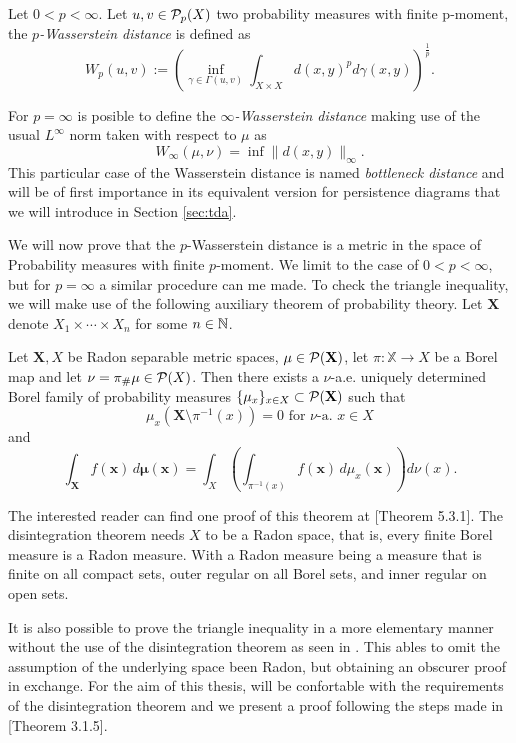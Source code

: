 \begin{definition}
    Let $ 0 < p < \infty $. Let $ u, v \in \mathcal P_p (X) $ two probability measures with finite p-moment, the {\it $p$-Wasserstein distance} is defined as
    $$
        W_p(u, v) := \left( \inf_{\gamma \in \Gamma(u, v)} \int_{X \times X} d(x,y)^p d\gamma(x, y)\right)^{\frac{1}{p}}.
    $$
\end{definition}
For $ p= \infty $ is posible to define the {\it $\infty$-Wasserstein distance} making use of the usual $ L^\infty $ norm taken with respect to $ \mu $ as
$$
    W_\infty (\mu, \nu) = \inf \| d(x, y) \|_\infty.
$$
This particular case of the Wasserstein distance is named {\it bottleneck distance} and will be of first importance in its equivalent version for persistence diagrams that we will introduce in Section \ref{sec:tda}.

We will now prove that the $p$-Wasserstein distance is a metric in the space of Probability measures with finite $p$-moment. We limit to the case of $ 0 < p < \infty $, but for $ p= \infty $ a similar procedure can me made. To check the triangle inequality, we will make use of the following auxiliary theorem of probability theory. Let $ \mathbf X $ denote $ X_1  \times \cdots \times X_n $ for some $ n \in \mathbb N $.

\begin{theorem}[Disintegration] \label{thm:disintegration}
    Let $ \mathbf X, X $ be Radon separable metric spaces, $ \mathbf \mu \in \mathcal P(\mathbf X) $, let $ \pi: \mathbb X \to X $ be a Borel map and let $ \nu = \pi_\#\mu \in \mathcal P(X) $. Then there exists a $\nu$-a.e. uniquely determined Borel family of probability measures $ \{\mu_x\}_{x \in X} \subset \mathcal P(\mathbf X) $ such that
    $$
        \mu_x(\mathbf X \setminus \pi^{-1}(x)) = 0 \text{ for } \nu \text{-a. } x \in X
    $$
    and
    $$
        \int_{\mathbf X} f(\mathbf x) \, d \mathbf \mu( \mathbf x) = \int_X \left( \int_{\pi^{-1}(x)} f(\mathbf x) \, d\mu_x( \mathbf x) \right) d\nu(x).
    $$
\end{theorem}

The interested reader can find one proof of this theorem at \cite{ambrosio}[Theorem 5.3.1]. The disintegration theorem needs $ X $ to be a Radon space, that is, every finite Borel measure is a Radon measure. With a Radon measure being a measure that is finite on all compact sets, outer regular on all Borel sets, and inner regular on open sets.

It is also possible to prove the triangle inequality in a more elementary manner without the use of the disintegration theorem as seen in \cite{elementary}. This ables to omit the assumption of the underlying space been Radon, but obtaining an obscurer proof in exchange. For the aim of this thesis, will be confortable with the requirements of the disintegration theorem and we present a proof following the steps made in \cite{Figalli}[Theorem 3.1.5].

